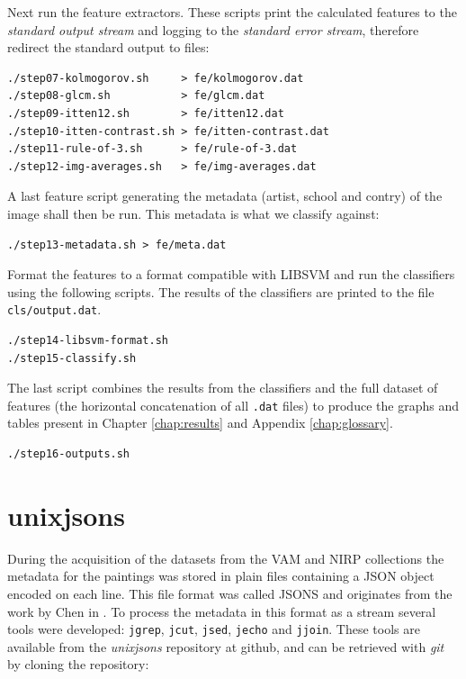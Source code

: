 \documentclass[11pt,a4paper,twoside,openright,draft]{report}
\begin{document}
Next run the feature extractors.  These scripts print the calculated features
to the \emph{standard output stream} and logging to the \emph{standard error
stream}, therefore redirect the standard output to files:

\begin{Verbatim}[frame=leftline]
./step07-kolmogorov.sh     > fe/kolmogorov.dat
./step08-glcm.sh           > fe/glcm.dat
./step09-itten12.sh        > fe/itten12.dat
./step10-itten-contrast.sh > fe/itten-contrast.dat
./step11-rule-of-3.sh      > fe/rule-of-3.dat
./step12-img-averages.sh   > fe/img-averages.dat
\end{Verbatim}

A last feature script generating the metadata (artist, school and contry) of
the image shall then be run.  This metadata is what we classify against:

\begin{Verbatim}[frame=leftline]
./step13-metadata.sh > fe/meta.dat
\end{Verbatim}

Format the features to a format compatible with LIBSVM and run the classifiers
using the following scripts.  The results of the classifiers are printed to the
file \texttt{cls/output.dat}.

\begin{Verbatim}[frame=leftline]
./step14-libsvm-format.sh
./step15-classify.sh
\end{Verbatim}

The last script combines the results from the classifiers and the full dataset
of features (the horizontal concatenation of all \texttt{.dat} files) to
produce the graphs and tables present in Chapter \ref{chap:results} and
Appendix \ref{chap:glossary}.

\begin{Verbatim}[frame=leftline]
./step16-outputs.sh
\end{Verbatim}

\chapter{unixjsons}
\label{chap:unixjsons}

During the acquisition of the datasets from the VAM and NIRP collections the
metadata for the paintings was stored in plain files containing a JSON object
encoded on each line.  This file format was called JSONS and originates from
the work by Chen in \cite{chen09yahoo}.  To process the metadata in this format
as a stream several tools were developed: \texttt{jgrep}, \texttt{jcut},
\texttt{jsed}, \texttt{jecho} and \texttt{jjoin}.  These tools are available
from the \emph{unixjsons} repository at github, and can be retrieved with
\emph{git} by cloning the repository:
\end{document}
